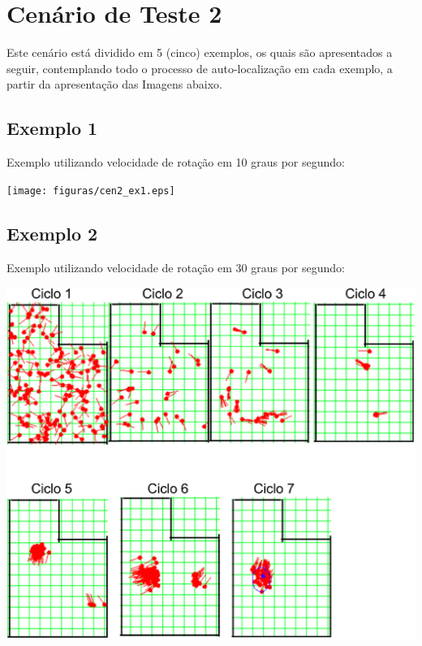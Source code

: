 \section{Cenário de Teste 2}

Este cenário está dividido em 5 (cinco) exemplos, os quais são apresentados a seguir, contemplando todo o processo de auto-localização
em cada exemplo, a partir da apresentação das Imagens abaixo.

\subsection{Exemplo 1}

Exemplo utilizando velocidade de rotação em 10 graus por segundo:

{\centering
\texttt{[image: figuras/cen2\_ex1.eps]}
\label{img:cen2_ex1}
\par}

\subsection{Exemplo 2}

Exemplo utilizando velocidade de rotação em 30 graus por segundo:

{\centering
\includegraphics[scale=0.4]{figuras/cen2_ex2.eps}
\label{img:cen2_ex2}
\par}

